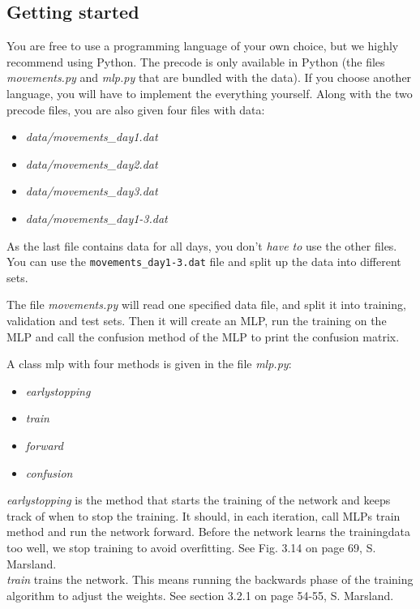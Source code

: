 \documentclass{article}           %
\begin{document}
\subsection*{Getting started}

You are free to use a programming language of your own choice, but we highly recommend using Python. The precode is only available in Python (the files \emph{movements.py} and \emph{mlp.py} that are bundled with the data). If you choose another language, you will have to implement the everything yourself. Along with the two precode files, you are also given four files with data:
\begin{itemize}
\item \emph{data/movements\_day1.dat}
\item \emph{data/movements\_day2.dat}
\item \emph{data/movements\_day3.dat}
\item \emph{data/movements\_day1-3.dat}
\end{itemize}
As the last file contains data for all days, you don't \emph{have to} use the other files.
You can use the \texttt{movements\_day1-3.dat} file and split up the data into different sets.


\noindent The file \emph{movements.py} will read one specified data file, and split it into training, validation and test sets. Then it will create an MLP, run the training on the MLP and call the confusion method of the MLP to print the confusion matrix.

\noindent A class mlp with four methods is given in the file \emph{mlp.py}:

\begin{itemize}
\item \emph{earlystopping}
\item \emph{train}
\item \emph{forward}
\item \emph{confusion}
\end{itemize}

\noindent \emph{earlystopping} is the method that starts the training of the network and keeps track of when to stop the training. It should, in each iteration, call MLPs train method and run the network forward. Before the network learns the trainingdata too well, we stop training to avoid overfitting. See Fig. 3.14 on page 69, S. Marsland.\\

\noindent \emph{train} trains the network. This means running the backwards phase of the training algorithm to adjust the weights. See section 3.2.1 on page 54-55, S. Marsland.\\
\end{document}
